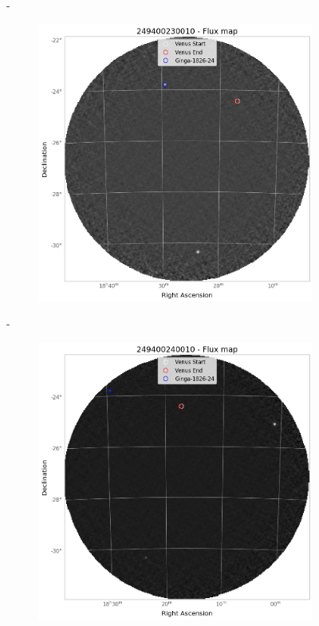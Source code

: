 \begin{figure}[H]
\begin{subfigure}{.3\textwidth}
        \end{subfigure}
        \hspace{1em}-
        \begin{subfigure}{.3\textwidth}
            \centering
            \includegraphics[width=\textwidth]{report/Figures/methods/2204/23_map.png}
        \end{subfigure}
        \hspace{1em}-
        \begin{subfigure}{.3\textwidth}
            \centering
            \includegraphics[width=\textwidth]{report/Figures/methods/2204/24_map.png}

\end{subfigure}
\end{figure}

